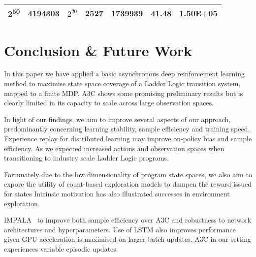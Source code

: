 \documentclass[runningheads]{llncs}
\begin{document}
\begin{table}[h]
\begin{tabular}{|c|c|c!{\color{black}\vrule}c|c|c|c|}
		\hline
		{}2\textsuperscript{50}                                                           & 4194303                                                                                                                    & {}$2^{20}$          & 2527                                                       & {}1739939                                                                                                                                                      & 41.48                                                      & {}1.50E+05                                                                                                                                                      \\
		\hline
	\end{tabular}
	\label{tab:results}
\end{table}



\section{Conclusion \& Future Work }
In this paper we have applied a basic asynchronous deep reinforcement learning method to maximise state space coverage of a Ladder Logic transition system, mapped to a finite MDP. A3C shows some promising preliminary results but is clearly limited in its capacity to scale across large observation spaces. 

In light of our findings, we aim to improve several aspects of our approach, predominantly concerning learning stability, sample efficiency and training speed. Experience replay for distributed learning may improve on-policy bias and sample efficiency. As we expected increased actions and observation spaces  when transitioning to industry scale Ladder Logic programs. 

Fortunately due to the low dimensionality of program state spaces, we also aim to expore the utility of count-based exploration models to dampen the reward issued for states Intrinsic motivation has also illustrated successes in environment exploration.

IMPALA~\cite{espeholt2018impala} to improve both sample efficiency over A3C and robustness to network architectures and hyperparameters. Use of LSTM also improves performance given GPU acceleration is maximised on larger batch updates. A3C in our setting experiences variable episodic updates.


 
%
%


%
% 
% 
%
\end{document}

